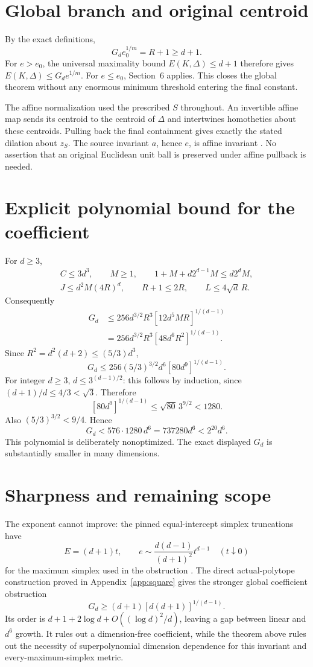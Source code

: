 \documentclass[11pt,letterpaper]{article}
\begin{document}
\section{Global branch and original centroid}
By the exact definitions,
\[
 G_d e_0^{1/m}=R+1\ge d+1.
\]
For $e>e_0$, the universal maximality bound $E(K,\Delta)\le d+1$ therefore
gives $E(K,\Delta)\le G_d e^{1/m}$. For $e\le e_0$, Section~6 applies.
This closes the global theorem without any enormous minimum threshold
entering the final constant.

The affine normalization used the prescribed $S$ throughout. An invertible
affine map sends its centroid to the centroid of $\Delta$ and intertwines
homotheties about these centroids. Pulling back the final containment gives
exactly the stated dilation about $z_S$. The source invariant $a$, hence
$e$, is affine invariant \cite{entry,released}. No assertion that an
original Euclidean unit ball is preserved under affine pullback is needed.

\section{Explicit polynomial bound for the coefficient}
For $d\ge3$,
\begin{gather*}
 C\le3d^3,\qquad M\ge1,\qquad
 1+M+d2^{d-1}M\le d2^dM,\\
 J\le d^2M(4R)^d,\qquad R+1\le2R,\qquad L\le4\sqrt d\,R.
\end{gather*}
Consequently
\begin{align*}
 G_d&\le256d^{3/2}R^3[12d^5MR]^{1/(d-1)}\\
    &=256d^{3/2}R^3[48d^6R^2]^{1/(d-1)}.
\end{align*}
Since $R^2=d^2(d+2)\le(5/3)d^3$,
\[
 G_d\le256(5/3)^{3/2}d^6[80d^9]^{1/(d-1)}.
\]
For integer $d\ge3$, $d\le3^{(d-1)/2}$: this follows by induction, since
$(d+1)/d\le4/3<\sqrt3$. Therefore
\[
 [80d^9]^{1/(d-1)}\le\sqrt{80}\,3^{9/2}<1280.
\]
Also $(5/3)^{3/2}<9/4$. Hence
\[
 G_d<576\cdot1280\,d^6=737280d^6<2^{20}d^6.
\]
This polynomial is deliberately nonoptimized. The exact displayed $G_d$
is substantially smaller in many dimensions.

\section{Sharpness and remaining scope}
The exponent cannot improve: the pinned equal-intercept simplex
truncations have
\[
 E=(d+1)t,\qquad
 e\sim\frac{d(d-1)}{(d+1)^2}t^{d-1}
 \quad(t\downarrow0)
\]
for the maximum simplex used in the obstruction \cite{sharp,truncation}.
The direct actual-polytope construction proved in Appendix~\ref{app:square}
gives the stronger global coefficient obstruction
\[
 G_d\ge(d+1)[d(d+1)]^{1/(d-1)}.
\]
Its order is $d+1+2\log d+O((\log d)^2/d)$, leaving a gap between linear
and $d^6$ growth. It rules out a dimension-free coefficient, while the
theorem above rules out the necessity of superpolynomial dimension
dependence for this invariant and every-maximum-simplex metric.
\end{document}
